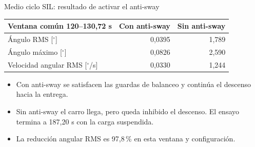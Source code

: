 \documentclass[aspectratio=169,11pt]{beamer}
\begin{document}
\begin{frame}[t,label=comparacionantisway]{Medio ciclo SIL: resultado de activar el anti-sway}
\begin{center}\small
\begin{tabular}{lrr}\toprule
Ventana común 120--130,72 s & Con anti-sway & Sin anti-sway\\\midrule
Ángulo RMS [$^\circ$] & 0,0395 & 1,789\\
Ángulo máximo [$^\circ$] & 0,0826 & 2,590\\
Velocidad angular RMS [$^\circ$/s] & 0,0330 & 1,244\\\bottomrule
\end{tabular}\end{center}
\begin{itemize}
\item Con anti-sway se satisfacen las guardas de balanceo y continúa el descenso hacia la entrega.
\item Sin anti-sway el carro llega, pero queda inhibido el descenso. El ensayo termina a 187,20 s con la carga suspendida.
\item La reducción angular RMS es 97,8\,\% en esta ventana y configuración.
\end{itemize}
\end{frame}
\end{document}
